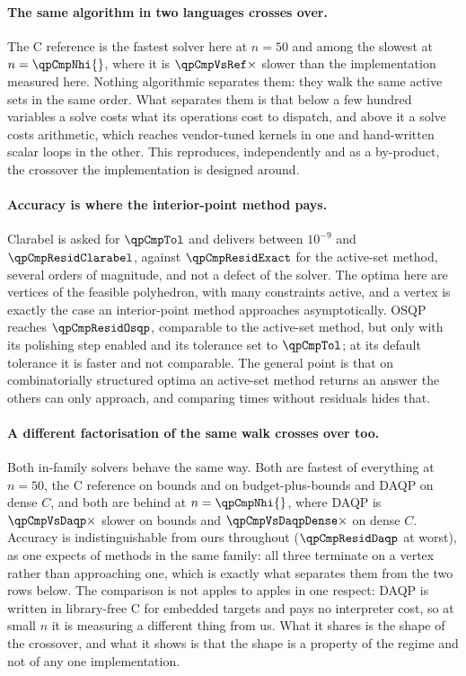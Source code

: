\paragraph{The same algorithm in two languages crosses over.} The C reference is
the fastest solver here at $n = 50$ and among the slowest at
$n = \qpCmpNhi{}$, where it is $\qpCmpVsRef\times$ slower than the
implementation measured here. Nothing algorithmic separates them: they
walk the same active sets in the same order. What separates them is that below a
few hundred variables a solve costs what its operations cost to dispatch, and
above it a solve costs arithmetic, which reaches vendor-tuned kernels in one and
hand-written scalar loops in the other. This reproduces, independently and as a
by-product, the crossover the implementation is designed around.

\paragraph{Accuracy is where the interior-point method pays.} Clarabel is asked
for $\qpCmpTol$ and delivers between $10^{-9}$ and
$\qpCmpResidClarabel$, against $\qpCmpResidExact$ for the active-set method,
several orders of magnitude, and not a defect of the solver. The optima here are
vertices of the feasible polyhedron, with many constraints active, and a vertex is
exactly the case an interior-point method approaches asymptotically. OSQP reaches
$\qpCmpResidOsqp$, comparable to the active-set method, but only with its
polishing step enabled and its tolerance set to $\qpCmpTol$; at its default
tolerance it is faster and not comparable. The general point is that on
combinatorially structured optima an active-set method returns an answer the
others can only approach, and comparing times without residuals hides that.

\paragraph{A different factorisation of the same walk crosses over too.} Both
in-family solvers behave the same way. Both are fastest of everything at $n = 50$,
the C reference on bounds and on budget-plus-bounds and DAQP on dense $C$, and both
are behind at
$n = \qpCmpNhi{}$, where DAQP is $\qpCmpVsDaqp\times$ slower on bounds and
$\qpCmpVsDaqpDense\times$ on dense $C$. Accuracy is indistinguishable from ours
throughout ($\qpCmpResidDaqp$ at worst), as one expects of methods in the same
family: all three terminate on a vertex rather than approaching one, which is
exactly what separates them from the two rows below. The comparison is not
apples to apples in one respect: DAQP is written in library-free C
for embedded targets and pays no interpreter cost, so at small $n$ it is measuring
a different thing from us. What it shares is the shape of the crossover, and what
it shows is that the shape is a property of the regime and not of any one
implementation.

